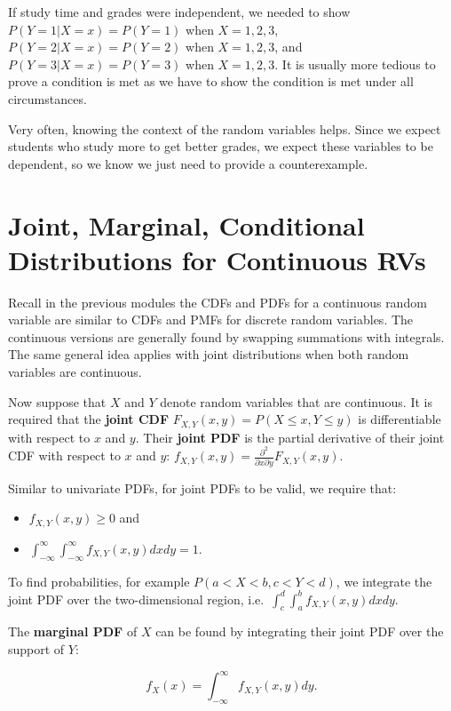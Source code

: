 \documentclass[
]{book}
\providecommand{\tightlist}{%
  \setlength{\itemsep}{0pt}\setlength{\parskip}{0pt}}
\begin{document}
If study time and grades were independent, we needed to show \(P(Y=1|X=x) = P(Y=1)\) when \(X=1,2,3\), \(P(Y=2|X=x) = P(Y=2)\) when \(X=1,2,3\), and \(P(Y=3|X=x) = P(Y=3)\) when \(X=1,2,3\). It is usually more tedious to prove a condition is met as we have to show the condition is met under all circumstances.

Very often, knowing the context of the random variables helps. Since we expect students who study more to get better grades, we expect these variables to be dependent, so we know we just need to provide a counterexample.

\hypertarget{jointCont}{%
\section{Joint, Marginal, Conditional Distributions for Continuous RVs}\label{jointCont}}

Recall in the previous modules the CDFs and PDFs for a continuous random variable are similar to CDFs and PMFs for discrete random variables. The continuous versions are generally found by swapping summations with integrals. The same general idea applies with joint distributions when both random variables are continuous.

Now suppose that \(X\) and \(Y\) denote random variables that are continuous. It is required that the \textbf{joint CDF} \(F_{X,Y}(x,y) = P(X \leq x, Y \leq y)\) is differentiable with respect to \(x\) and \(y\). Their \textbf{joint PDF} is the partial derivative of their joint CDF with respect to \(x\) and \(y\): \(f_{X,Y}(x,y) = \frac{\partial^2}{\partial x \partial y} F_{X,Y}(x,y)\).

Similar to univariate PDFs, for joint PDFs to be valid, we require that:

\begin{itemize}
\tightlist
\item
  \(f_{X,Y}(x,y) \geq 0\) and
\item
  \(\int_{-\infty}^\infty \int_{-\infty}^\infty f_{X,Y}(x,y) dx dy = 1\).
\end{itemize}

To find probabilities, for example \(P(a<X<b, c<Y<d)\), we integrate the joint PDF over the two-dimensional region, i.e.~\(\int_{c}^d \int_{a}^b f_{X,Y}(x,y) dx dy\).

The \textbf{marginal PDF} of \(X\) can be found by integrating their joint PDF over the support of \(Y\):

\begin{equation} 
f_X(x) = \int_{-\infty}^\infty f_{X,Y}(x,y) dy.
\label{eq:5-margPDF}
\end{equation}
\end{document}
